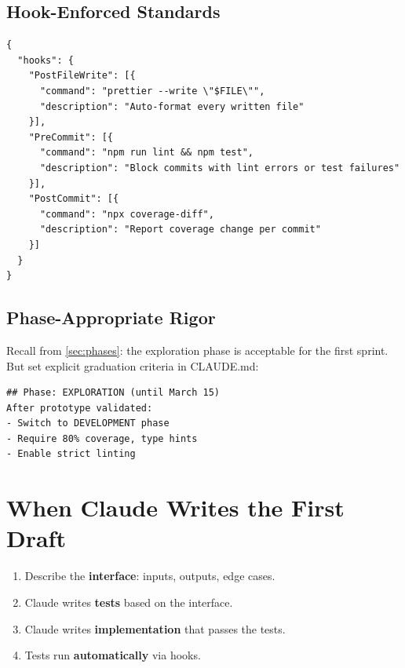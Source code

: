 \subsection{Hook-Enforced Standards}


\begin{verbatim}
{
  "hooks": {
    "PostFileWrite": [{
      "command": "prettier --write \"$FILE\"",
      "description": "Auto-format every written file"
    }],
    "PreCommit": [{
      "command": "npm run lint && npm test",
      "description": "Block commits with lint errors or test failures"
    }],
    "PostCommit": [{
      "command": "npx coverage-diff",
      "description": "Report coverage change per commit"
    }]
  }
}
\end{verbatim}

\subsection{Phase-Appropriate Rigor}

Recall from \cref{sec:phases}: the exploration phase is acceptable for the
first sprint. But set explicit graduation criteria in CLAUDE.md:

\begin{verbatim}
## Phase: EXPLORATION (until March 15)
After prototype validated:
- Switch to DEVELOPMENT phase
- Require 80% coverage, type hints
- Enable strict linting
\end{verbatim}

\section{When Claude Writes the First Draft}
\label{sec:test-first}



\begin{enumerate}
  \item Describe the \textbf{interface}: inputs, outputs, edge cases.
  \item Claude writes \textbf{tests} based on the interface.
  \item Claude writes \textbf{implementation} that passes the tests.
  \item Tests run \textbf{automatically} via hooks.
\end{enumerate}

